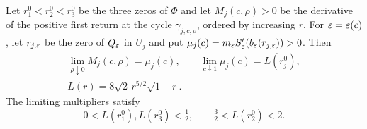 \begin{corollary}
\label{p4:multiplier-limits}
Let $r_1^0<r_2^0<r_3^0$ be the three zeros of $\Phi$ and let
$M_j(c,\rho)>0$ be the derivative of the positive first return at
the cycle $\gamma_{j,c,\rho}$, ordered by increasing $r$.
For $\varepsilon=\varepsilon(c)$, let $r_{j,\varepsilon}$ be the zero of $Q_\varepsilon$ in
$U_j$ and put $\mu_j(c)=m_\varepsilon S_\varepsilon'(b_\varepsilon(r_{j,\varepsilon}))>0$.
Then
\begin{equation}\label{p4:multiplier-successive-limits}
 \begin{gathered}
 \lim_{\rho\downarrow0}M_j(c,\rho)=\mu_j(c),\qquad
 \lim_{c\downarrow1}\mu_j(c)=L(r_j^0),\\
 L(r)=8\sqrt2\,r^{5/2}\sqrt{1-r}.
 \end{gathered}
\end{equation}
The limiting multipliers satisfy
\begin{equation}\label{p4:multiplier-intervals}
 0<L(r_1^0),L(r_3^0)<\tfrac12,
 \qquad \tfrac32<L(r_2^0)<2.
\end{equation}
\end{corollary}
